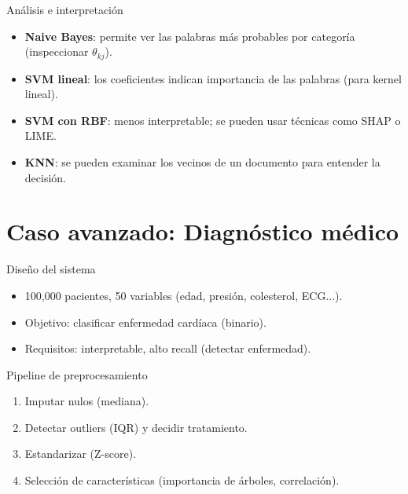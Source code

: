 \documentclass[aspectratio=169, 10pt, xcolor=table]{beamer}
\begin{document}
\begin{frame}{Análisis e interpretación}
    \begin{itemize}
        \item \textbf{Naive Bayes}: permite ver las palabras más probables por categoría (inspeccionar $\theta_{kj}$).
        \item \textbf{SVM lineal}: los coeficientes indican importancia de las palabras (para kernel lineal).
        \item \textbf{SVM con RBF}: menos interpretable; se pueden usar técnicas como SHAP o LIME.
        \item \textbf{KNN}: se pueden examinar los vecinos de un documento para entender la decisión.
    \end{itemize}
\end{frame}

\section{Caso avanzado: Diagnóstico médico}

\begin{frame}{Diseño del sistema}
    \begin{itemize}
        \item 100,000 pacientes, 50 variables (edad, presión, colesterol, ECG...).
        \item Objetivo: clasificar enfermedad cardíaca (binario).
        \item Requisitos: interpretable, alto recall (detectar enfermedad).
    \end{itemize}
    \begin{block}{Pipeline de preprocesamiento}
        \begin{enumerate}
            \item Imputar nulos (mediana).
            \item Detectar outliers (IQR) y decidir tratamiento.
            \item Estandarizar (Z-score).
            \item Selección de características (importancia de árboles, correlación).
        \end{enumerate}
    \end{block}
\end{frame}
\end{document}
